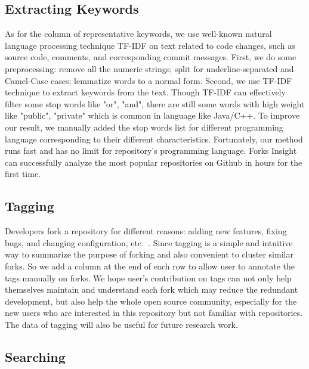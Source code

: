 \subsection{Extracting Keywords}
As for the column of representative keywords, we use well-known natural language processing technique TF-IDF \cite{salton1988term} on text related to code changes, such as source code, comments, and corresponding commit messages. First, we do some preprocessing: remove all the numeric strings; split for underline-separated and Camel-Case cases; lemmatize words to a normal form. Second, we use TF-IDF technique to extract keywords from the text. Though TF-IDF can effectively filter some stop words like "or", "and", there are still some words with high weight like "public", "private" which is common in language like Java/C++. To improve our result, we manually added the stop words list for different programming language corresponding to their different characteristics.
%
Fortunately, our method runs fast and has no limit for repository's programming language. Forks Insight can successfully analyze the most popular repositories on Github in hours for the first time.

\subsection{Tagging}
Developers fork a repository for different reasons: adding new features, fixing bugs, and changing configuration, etc.~\cite{Mikkonen2011,Robles2012,dubinsky2013exploratory,stanciulescu2015forked}.
%
Since tagging is a simple and intuitive way to summarize the purpose of forking and also convenient to cluster similar forks. So we add a column at the end of each row to allow user to annotate the tags manually on forks. We hope user's contribution on tags can not only help themselves maintain and understand each fork which may reduce the redundant development, but also help the whole open source community, especially for the new users who are interested in this repository but not familiar with repositories. The data of tagging will also be useful for future research work.


\subsection{Searching}

